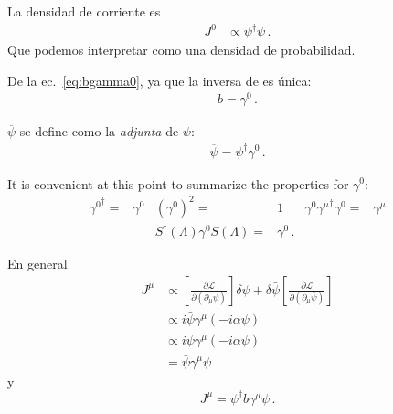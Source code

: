 La  densidad de corriente es
\begin{align}
  J^0&\propto \psi^\dagger\psi\,.
\end{align}
Que podemos interpretar como una densidad de probabilidad.

De la ec.~\eqref{eq:bgamma0}, ya que la inversa de es única:
\begin{align}
  b=\gamma^0\,.
\end{align}
 
$\overline{\psi}$ se define como la \emph{adjunta} de $\psi$:
 \begin{align}
   \overline{\psi}=\psi^\dagger\gamma^0\,.
 \end{align}

It is convenient at this point to summarize the properties for $\gamma^0$:
\begin{align}
  \label{eq:cft77}
  {\gamma^0}^\dagger=&\gamma^0 & \left(\gamma^0\right)^2=&1 & \gamma^0{\gamma^\mu}^\dagger\gamma^0=&\gamma^\mu\nonumber\\
 &&   S^\dagger(\Lambda)\gamma^0S(\Lambda)=&\gamma^0\,. &&
\end{align}



En general
\begin{align}
   J^\mu&\propto\left[\frac{\partial\mathcal{L}}{\partial\left(\partial_\mu\psi\right)}\right]\delta\psi+\delta\bar{\psi}\left[\frac{\partial\mathcal{L}}{\partial\left(\partial_\mu\bar{\psi}\right)}\right]\nonumber\\
   &\propto i\bar{\psi}\gamma^\mu(-i\alpha\psi)\nonumber\\
   &\propto i\bar{\psi}\gamma^\mu(-i\alpha\psi)\nonumber\\
   &=\bar{\psi}\gamma^\mu\psi
\end{align}
y
\begin{equation}
     J^\mu=\psi^\dagger b \gamma^\mu\psi\,.
\end{equation}

